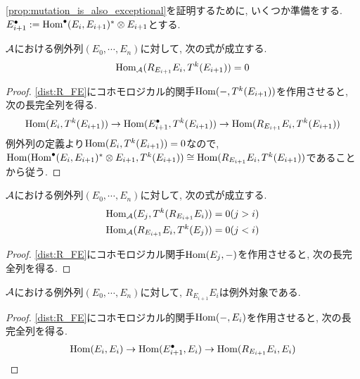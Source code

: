\documentclass[uplatex, a4paper, 14Q, dvipdfmx]{jsarticle}
\begin{document}
\cref{prop:mutation_is_also_exceptional}を証明するために, いくつか準備をする. 
$E^\bullet_{i+1} := \mathrm{Hom}^\bullet(E_i,E_{i+1})^\ast \otimes E_{i+1}$とする. 

\begin{lemma}
  $\mathcal{A}$における例外列$(E_0,\cdots,E_n)$に対して, 次の式が成立する.
  \begin{align*}
    \mathrm{Hom}_{\mathcal{A}}(R_{E_{i+1}}E_i, T^k(E_{i+1})) = 0
  \end{align*}
\end{lemma}

\begin{proof}
  \cref{dist:R_FE}にコホモロジカル的関手$\mathrm{Hom}(-,T^k(E_{i+1}))$を作用させると, 次の長完全列を得る. 
  \begin{align*}
    \mathrm{Hom}(E_i,T^k(E_{i+1})) \to \mathrm{Hom}(E^\bullet_{i+1},T^k(E_{i+1})) \to \mathrm{Hom}(R_{E_{i+1}}E_i,T^k(E_{i+1}))
  \end{align*}
  例外列の定義より$\mathrm{Hom}(E_i,T^k(E_{i+1})) = 0$なので, $\mathrm{Hom}(\mathrm{Hom}^\bullet(E_i,E_{i+1})^\ast \otimes E_{i+1},T^k(E_{i+1})) \cong \mathrm{Hom}(R_{E_{i+1}}E_i,T^k(E_{i+1}))$であることから従う. 
\end{proof}

\begin{lemma}
  $\mathcal{A}$における例外列$(E_0,\cdots,E_n)$に対して, 次の式が成立する.
  \begin{align*}
    \mathrm{Hom}_{\mathcal{A}}(E_j, T^k(R_{E_{i+1}}E_i)) = 0 & (j > i) \\
    \mathrm{Hom}_{\mathcal{A}}(R_{E_{i+1}}E_i, T^k(E_j)) = 0 & (j < i)
  \end{align*}
\end{lemma}

\begin{proof}
  \cref{dist:R_FE}にコホモロジカル関手$\mathrm{Hom}(E_j,-)$を作用させると, 次の長完全列を得る.

\end{proof}

\begin{lemma}
  $\mathcal{A}$における例外列$(E_0,\cdots,E_n)$に対して, $R_{E_{i+1}}E_i$は例外対象である. 
\end{lemma}

\begin{proof}
  \cref{dist:R_FE}にコホモロジカル的関手$\mathrm{Hom}(-,E_i)$を作用させると, 次の長完全列を得る. 
  \begin{align*}
    \mathrm{Hom}(E_i,E_i) \to \mathrm{Hom}(E^\bullet_{i+1},E_i) \to \mathrm{Hom}(R_{E_{i+1}}E_i,E_i)
  \end{align*}
\end{proof}
\end{document}
